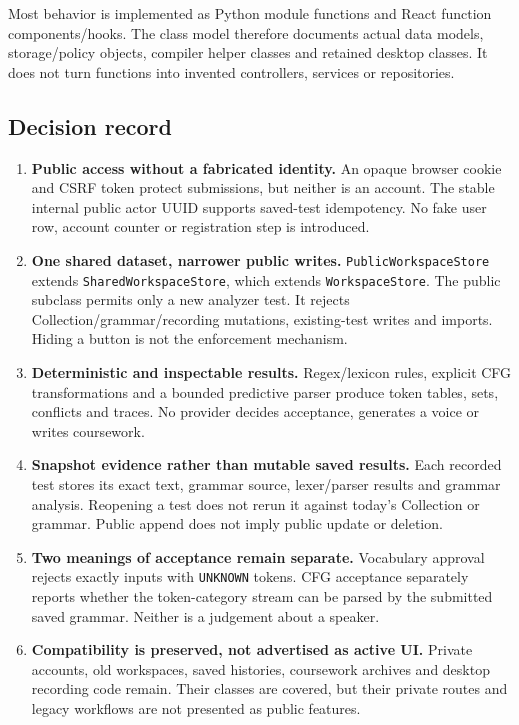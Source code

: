 \documentclass[11pt,a4paper]{article}
\begin{document}
Most behavior is implemented as Python module functions and React function
components/hooks. The class model therefore documents actual data models,
storage/policy objects, compiler helper classes and retained desktop classes.
It does not turn functions into invented controllers, services or repositories.

\subsection{Decision record}
\begin{enumerate}
\item \textbf{Public access without a fabricated identity.}
An opaque browser cookie and CSRF token protect submissions, but neither is an
account. The stable internal public actor UUID supports saved-test idempotency.
No fake user row, account counter or registration step is introduced.
\item \textbf{One shared dataset, narrower public writes.}
\texttt{PublicWorkspaceStore} extends \texttt{SharedWorkspaceStore}, which extends
\texttt{WorkspaceStore}. The public subclass permits only a new analyzer test.
It rejects Collection/grammar/recording mutations, existing-test writes and
imports. Hiding a button is not the enforcement mechanism.
\item \textbf{Deterministic and inspectable results.}
Regex/lexicon rules, explicit CFG transformations and a bounded predictive
parser produce token tables, sets, conflicts and traces. No provider decides
acceptance, generates a voice or writes coursework.
\item \textbf{Snapshot evidence rather than mutable saved results.}
Each recorded test stores its exact text, grammar source, lexer/parser results
and grammar analysis. Reopening a test does not rerun it against today's
Collection or grammar. Public append does not imply public update or deletion.
\item \textbf{Two meanings of acceptance remain separate.}
Vocabulary approval rejects exactly inputs with \texttt{UNKNOWN} tokens.
CFG acceptance separately reports whether the token-category stream can be
parsed by the submitted saved grammar. Neither is a judgement about a speaker.
\item \textbf{Compatibility is preserved, not advertised as active UI.}
Private accounts, old workspaces, saved histories, coursework archives and
desktop recording code remain. Their classes are covered, but their private
routes and legacy workflows are not presented as public features.
\end{enumerate}
\end{document}
